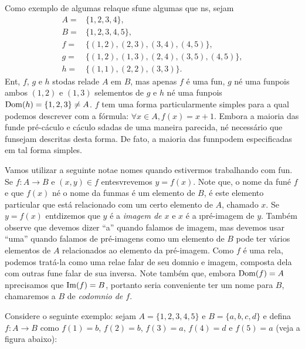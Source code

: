Como exemplo de algumas rela\coes que s\ao fun\coes e algumas que n\ao s\aoi, sejam
\begin{equation*}
 \begin{aligned}
A=&\{1,2,3,4\},\\
B=&\{1,2,3,4,5\},\\
f=&\{(1,2),(2,3),(3,4),(4,5)\},\\
g=&\{(1,2),(1,3),(2,4),(3,5),(4,5)\},\\
h=&\{(1,1),(2,2),(3,3)\}.
 \end{aligned}
\end{equation*}
Ent\aoi, $f$, $g$ e $h$ s\ao todas rela\coes de $A$ em $B$, mas apenas $f$ \'e uma fun\caoi, $g$ n\ao \'e uma fun\cao pois ambos $(1,2)$ e $(1,3)$ s\ao elementos de $g$ e $h$ n\ao \'e uma fun\cao pois $\operatorname{Dom}(h)=\{1,2,3\}\neq A$. $f$ tem uma forma particularmente simples para a qual podemos descrever com a f\'ormula: $\forall x\in A, f(x)=x+1$. Embora a maioria das fun\coes de pr\'e-c\'aculo e c\'aculo s\ao dadas de uma maneira parecida, n\ao \'e necess\'ario que fun\coes sejam descritas desta forma. De fato, a maioria das fun\coes n\ao podem especificadas em tal forma simples.

Vamos utilizar a seguinte nota\cao e nomes quando estivermos trabalhando com fun\cois. Se $f:A\to B$ e $(x,y)\in f$ ent\ao esvrevemos $y=f(x)$. Note que, o nome da fun\cao \'e $f$ e que $f(x)$ n\ao \'e o nome da fun\cao mas \'e um elemento de $B$, \'e este elemento particular que est\'a relacionado com um certo elemento de $A$, chamado $x$. Se $y=f(x)$ ent\ao dizemos que $y$ \'e a {\it imagem de $x$} e $x$ \'e a {\i pr\'e-imagem de $y$.} Tamb\'em observe que devemos dizer ``a'' quando falamos de imagem, mas devemos usar ``uma'' quando falamos de pr\'e-imagens como um elemento de $B$ pode ter v\'arios elementos de $A$ relacionados ao elemento da pr\'e-imagem. Como $f$ \'e uma rela\caoi, podemos trat\'a-la como uma rela\cao e falar de seu dom\ih nio e imagem, composta dela com outras fun\coes e falar de sua inversa. Note tamb\'em que, embora $\operatorname{Dom}(f)=A$ n\ao precisamos que $\operatorname{Im}(f)=B$, portanto seria conveniente ter um nome para $B$, chamaremos a $B$ de {\it codom\ih nio de $f$}. 

Considere o seguinte exemplo: sejam $A=\{1,2,3,4,5\}$ e $B=\{a,b,c,d\}$ e defina $f:A\to B$ como $f(1)=b$, $f(2)=b$, $f(3)=a$, $f(4)=d$ e $f(5)=a$ (veja a figura abaixo):


